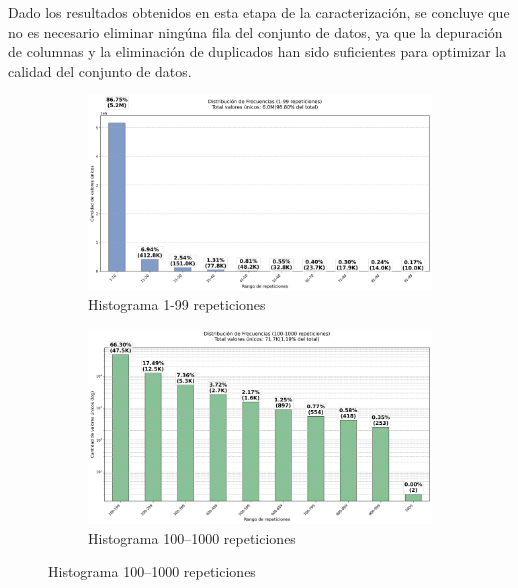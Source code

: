 Dado los resultados obtenidos en esta etapa de la caracterización, se concluye que no es necesario eliminar ningúna fila del conjunto de datos, ya que la depuración de columnas y la eliminación de duplicados han sido suficientes para optimizar la calidad del conjunto de datos.

\begin{figure}[H]
    \centering
    \begin{subfigure}[t]{0.48\textwidth-1em}
        \includegraphics[width=\linewidth]{img/histograma_1-99_identifier_Mobility_Data_Slim_DeDuplicate.png}
        \caption{Histograma 1-99 repeticiones}
        \label{fig:sub1}
    \end{subfigure}
    \hfill
    \begin{subfigure}[t]{0.48\textwidth-1em}
        \includegraphics[width=\linewidth]{img/histograma_100-1k_identifier_Mobility_Data_Slim_DeDuplicate.png}
        \caption{Histograma 100–1000 repeticiones}
        \label{fig:sub2}
    \end{subfigure}

    \vspace{0.5cm}


\end{figure}
